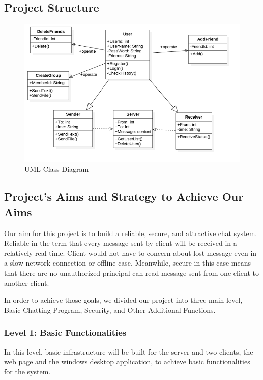 \documentclass[a4paper]{article}
\begin{document}
\subsection{Project Structure}

\begin{figure}[h]
\centering
\includegraphics[width = 0.85 \textwidth ]{UML.png}
\caption{\label{fig:UML}UML Class Diagram}
\end{figure}

\subsection{Project's Aims and Strategy to Achieve Our Aims}
Our aim for this project is to build a reliable, secure, and attractive chat system. Reliable in the term that every message sent by client will be received in a relatively real-time. Client would not have to concern about lost message even in a slow network connection or offline case. Meanwhile, secure in this case means that there are no unauthorized principal can read message sent from one client to another client.

In order to achieve those goals, we divided our project into three main level, Basic Chatting Program, Security, and Other Additional Functions. 

\subsubsection{Level 1: Basic Functionalities}

In this level, basic infrastructure will be built for the server and two clients, the web page and the windows desktop application, to achieve basic functionalities for the system. 
\end{document}
